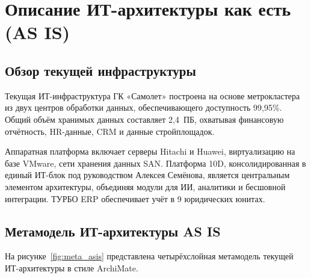 \documentclass[12pt,a4paper]{article}
\begin{document}
\newpage

\section{Описание ИТ-архитектуры как есть (AS IS)}

\subsection{Обзор текущей инфраструктуры}

Текущая ИТ-инфраструктура ГК «Самолет» построена на основе метрокластера из двух центров обработки данных, обеспечивающего доступность 99,95\%. Общий объём хранимых данных составляет 2,4~ПБ, охватывая финансовую отчётность, HR-данные, CRM и данные стройплощадок.

Аппаратная платформа включает серверы Hitachi и Huawei, виртуализацию на базе VMware, сети хранения данных SAN. Платформа 10D, консолидированная в единый ИТ-блок под руководством Алексея Семёнова, является центральным элементом архитектуры, объединяя модули для ИИ, аналитики и бесшовной интеграции. ТУРБО ERP обеспечивает учёт в 9 юридических юнитах.

\subsection{Метамодель ИТ-архитектуры AS IS}

На рисунке~\ref{fig:meta_asis} представлена четырёхслойная метамодель текущей ИТ-архитектуры в стиле ArchiMate.
\end{document}
